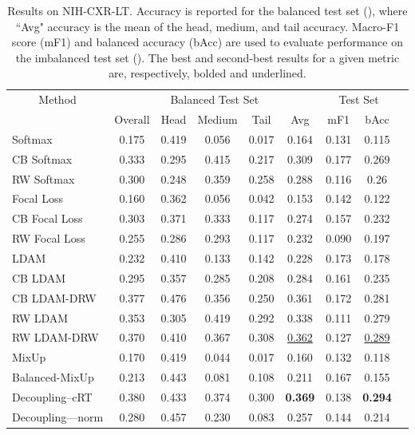 \documentclass[runningheads]{llncs}
\begin{document}
\begin{table}[!hb]
    \centering
     \vspace{-1em}
	\renewcommand{\arraystretch}{1.1}
    \caption{Results on NIH-CXR-LT. Accuracy is reported for the balanced test set (), where ``Avg" accuracy is the mean of the head, medium, and tail accuracy. Macro-F1 score (mF1) and balanced accuracy (bAcc) are used to evaluate performance on the imbalanced test set (). The best and second-best results for a given metric are, respectively, bolded and underlined.}
    \begin{tabular}{@{}lcccccccc@{}}
        \toprule
        \multicolumn{1}{c}{Method} & \multicolumn{5}{c}{Balanced Test Set} & \multicolumn{2}{c}{Test Set} \\
        \cmidrule(lr){2-6} \cmidrule(lr){7-8}
         & Overall & Head & Medium & Tail & Avg & mF1 & bAcc \\
\midrule
        Softmax & 0.175 & 0.419 & 0.056 & 0.017 & 0.164 & 0.131 & 0.115 \\
        CB Softmax & 0.333 & 0.295 & 0.415 & 0.217 & 0.309 & 0.177 & 0.269 \\
        RW Softmax & 0.300 & 0.248 & 0.359 & 0.258 & 0.288 & 0.116 & 0.26 \\
        Focal Loss & 0.160 & 0.362 & 0.056 & 0.042 & 0.153 & 0.142 & 0.122 \\
        CB Focal Loss & 0.303 & 0.371 & 0.333 & 0.117 & 0.274 & 0.157 & 0.232 \\
        RW Focal Loss & 0.255 & 0.286 & 0.293 & 0.117 & 0.232 & 0.090 & 0.197 \\
        LDAM & 0.232 & 0.410 & 0.133 & 0.142 & 0.228 & 0.173 & 0.178 \\
        CB LDAM & 0.295 & 0.357 & 0.285 & 0.208 & 0.284 & 0.161 & 0.235 \\
        CB LDAM-DRW & 0.377 & 0.476 & 0.356 & 0.250 & 0.361 & 0.172 & 0.281 \\
        RW LDAM & 0.353 & 0.305 & 0.419 & 0.292 & 0.338 & 0.111 & 0.279 \\
        RW LDAM-DRW & 0.370 & 0.410 & 0.367 & 0.308 & \underline{0.362} & 0.127 & \underline{0.289} \\
        MixUp & 0.170 & 0.419 & 0.044 & 0.017 & 0.160 & 0.132 & 0.118 \\
        Balanced-MixUp & 0.213 & 0.443 & 0.081 & 0.108 & 0.211 & 0.167 & 0.155 \\
        Decoupling--cRT & 0.380 & 0.433 & 0.374 & 0.300 & \textbf{0.369} & 0.138 & \textbf{0.294} \\
        Decoupling---norm & 0.280 & 0.457 & 0.230 & 0.083 & 0.257 & 0.144 & 0.214 \\
\bottomrule
    \end{tabular}
    \label{results:nih}
\end{table}
\end{document}
